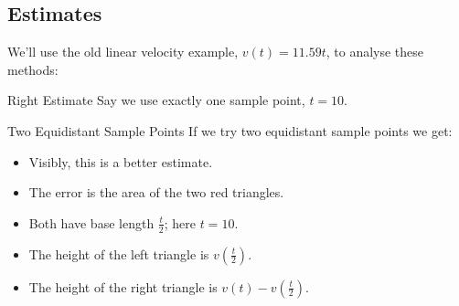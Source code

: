 \documentclass[Lecture.tex]{subfiles}
\begin{document}
\subsection{Estimates}
\begin{frame}
  We'll use the old linear velocity example, $v(t) = 11.59t$, to analyse these methods:
\end{frame}

\begin{frame}{Right Estimate}
  Say we use exactly one sample point, $t = 10$.
\end{frame}

\begin{frame}{Two Equidistant Sample Points}
  If we try two equidistant sample points we get:\\
  \vfill
  \begin{minipage}{0.48\linewidth}
  \end{minipage}
  \hfill
  \begin{minipage}{0.48\linewidth}
    \begin{itemize}
    \item<3->
      Visibly, this is a better estimate.
    \item<4->
      The error is the area of the two red triangles.
    \item<5->
      Both have base length $\frac{t}{2}$; here $t = 10$.
    \item<6->
      The height of the left triangle is $v\left(\frac{t}{2}\right)$.
    \item<7->
      The height of the right triangle is $v(t) - v\left(\frac{t}{2}\right)$.
    \end{itemize}
  \end{minipage}
\end{frame}
\end{document}

